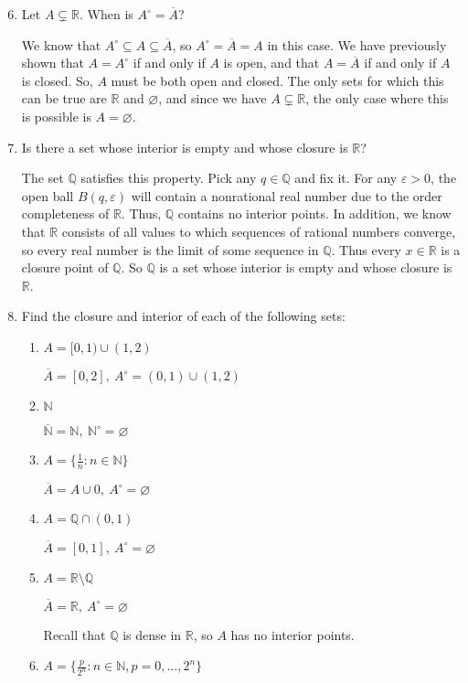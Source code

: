 \documentclass[11pt]{article}
\newcommand{\N}{\mathbb{N}}
\newcommand{\Q}{\mathbb{Q}}
\newcommand{\R}{\mathbb{R}}
\begin{document}
\begin{enumerate}
\setcounter{enumi}{5}

\item Let $A\subsetneq\R$. When is $A^\circ = \overline{A}$?

We know that $A^\circ\subseteq A\subseteq \overline{A}$, so 
$A^\circ = \overline{A} = A$ in this case. We have previously shown that
$A=A^\circ$ if and only if $A$ is open, and that 
$A=\overline{A}$ if and only if $A$ is closed. So, $A$
must be both open and closed. The only sets for which this can be true are
$\R$ and $\varnothing$, and since we have $A\subsetneq \R$, the only case
where this is possible is $A=\varnothing$.

\item Is there a set whose interior is empty and whose closure is $\R$?

The set $\Q$ satisfies this property. Pick any $q\in\Q$ and fix it. For
any $\varepsilon>0$, the open ball $B(q,\varepsilon)$ will contain a
nonrational real number due to the order completeness of $\R$. Thus,
$\Q$ contains no interior points. In addition, we know that $\R$ consists
of all values to which sequences of rational numbers converge, so every
real number is the limit of some sequence in $\Q$. Thus every $x\in\R$
is a closure point of $\Q$. So $\Q$ is a set whose interior is empty and
whose closure is $\R$.  

\item Find the closure and interior of each of the following sets:

\begin{enumerate}
\item{$A=[0,1)\cup(1,2)$}

$\overline{A}=[0,2],\ A^\circ=(0,1)\cup(1,2)$
\item{$\N$}

$\overline{\N}=\N,\ \N^\circ=\varnothing$
\item{$A=\{\frac{1}{n}:n\in\N\}$}

$\overline{A}=A\cup0,\ A^\circ=\varnothing$
\item{$A=\Q\cap(0,1)$}

$\overline{A}=[0,1],\ A^\circ=\varnothing$
\item{$A=\R\setminus\Q$}

$\overline{A}=\R,\ A^\circ=\varnothing$ 

Recall that $\Q$ is dense in $\R$, so $A$ has no interior points.
\item{$A=\{\frac{p}{2^n}:n\in\N,p=0,\ldots,2^n\}$}


\end{enumerate}
\end{enumerate}
\end{document}

